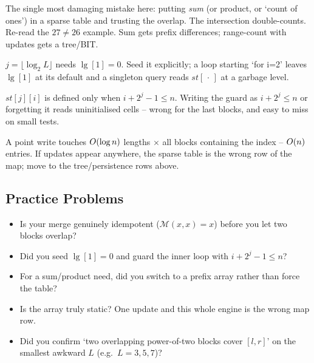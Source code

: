 \begin{warningbox}
The single most damaging mistake here: putting \emph{sum} (or product, or `count of ones') in a sparse table and trusting the overlap. The intersection double-counts. Re-read the \(27\ne26\) example. Sum gets prefix differences; range-count with updates gets a tree/BIT.
\end{warningbox}

\begin{warningbox}
\(j=\lfloor\log_2 L\rfloor\) needs \(\lg[1]=0\). Seed it explicitly; a loop starting `for i=2' leaves \(\lg[1]\) at its default and a singleton query reads \(\mathit{st}[\,\cdot\,]\) at a garbage level.
\end{warningbox}

\begin{warningbox}
\(\mathit{st}[j][i]\) is defined only when \(i+2^j-1\le n\). Writing the guard as \(i+2^j\le n\) or forgetting it reads uninitialised cells -- wrong for the last blocks, and easy to miss on small tests.
\end{warningbox}

\begin{warningbox}
A point write touches \(O(\log n)\) lengths \(\times\) all blocks containing the index -- \(O(n)\) entries. If updates appear anywhere, the sparse table is the wrong row of the map; move to the tree/persistence rows above.
\end{warningbox}

\subsection{Practice Problems}

\begin{stuckbox}
\begin{itemize}[nosep,leftmargin=1.4em]
  \item Is your merge genuinely idempotent (\(\mathcal{M}(x,x)=x\)) before you let two blocks overlap?
  \item Did you seed \(\lg[1]=0\) and guard the inner loop with \(i+2^j-1\le n\)?
  \item For a sum/product need, did you switch to a prefix array rather than force the table?
  \item Is the array truly static?  One update and this whole engine is the wrong map row.
  \item Did you confirm `two overlapping power-of-two blocks cover \([l,r]\)' on the smallest awkward \(L\) (e.g.\ \(L=3,5,7\))?
\end{itemize}
\end{stuckbox}

